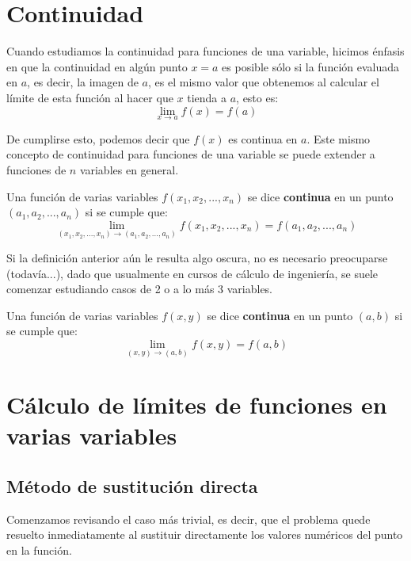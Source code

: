 \newpage
\section{Continuidad}

Cuando estudiamos la continuidad para funciones de una variable, hicimos énfasis en que la continuidad en algún punto $x=a$ es posible sólo si la función evaluada en $a$, es decir, la imagen de $a$, es el mismo valor que obtenemos al calcular el límite de esta función al hacer que $x$ tienda a $a$, esto es:
\[
\lim_{x\to a} f(x) = f(a)
\]

De cumplirse esto, podemos decir que $f(x)$ es continua en $a$. Este mismo concepto de continuidad para funciones de una variable se puede extender a funciones de $n$ variables en general.

\begin{definicion}
Una función de varias variables $f(x_1,x_2,...,x_n)$ se dice \textbf{continua} en un punto $(a_1,a_2,...,a_n)$ si se cumple que:
\[
\lim_{(x_1,x_2,...,x_n)\to (a_1,a_2,...,a_n)}f(x_1,x_2,...,x_n) = f(a_1,a_2,...,a_n)
\]
\end{definicion}

Si la definición anterior aún le resulta algo oscura, no es necesario preocuparse (todavía...), dado que usualmente en cursos de cálculo de ingeniería, se suele comenzar estudiando casos de 2 o a lo más 3 variables.

\begin{definicion}
Una función de varias variables $f(x,y)$ se dice \textbf{continua} en un punto $(a,b)$ si se cumple que:
\[
\lim_{(x,y)\to (a,b)}f(x,y) = f(a,b)
\]
\end{definicion}


\newpage
\section{Cálculo de límites de funciones en varias variables}

\subsection{Método de sustitución directa}

Comenzamos revisando el caso más trivial, es decir, que el problema quede resuelto inmediatamente al sustituir directamente los valores numéricos del punto en la función.

